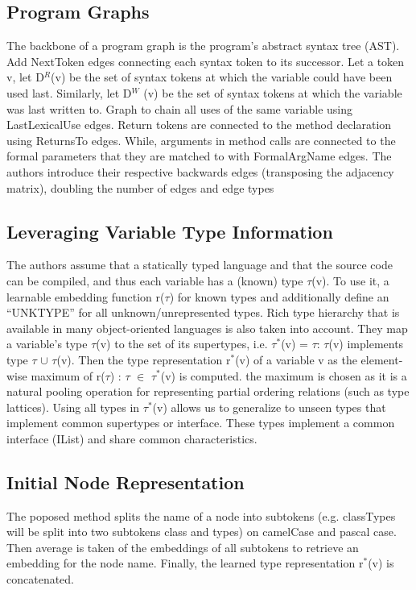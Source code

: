 \documentclass{article}
\begin{document}
\subsection{Program Graphs}
The backbone of a program graph is the program’s abstract syntax tree (AST). Add NextToken edges connecting each syntax token to its successor. Let a token v, let D$^R$(v) be the set of syntax tokens at which the variable could have been used last. Similarly, let D$^W$ (v) be the set of syntax tokens at which the variable was last written to. Graph to chain all uses of the same variable using LastLexicalUse edges. Return tokens are connected to the method declaration using ReturnsTo edges. While, arguments in method calls are connected to the formal parameters that they are matched to with FormalArgName edges. The authors introduce their respective backwards edges (transposing the adjacency matrix), doubling the number of edges and edge types

\subsection{Leveraging Variable Type Information}
The authors assume that a statically typed language and that the source code can be compiled, and thus each variable has a (known) type $\tau$(v). To use it, a learnable embedding function r($\tau$) for known types and additionally define an “UNKTYPE” for all unknown/unrepresented types. Rich type hierarchy that is available in many object-oriented languages is also taken into account. They map a variable’s type $\tau$(v) to the set of its supertypes, i.e. $\tau^\ast$(v) = {$\tau$: $\tau$(v) implements type $\tau$} $\cup$ {$\tau$(v)}. Then the type representation r$^\ast$(v) of a variable v as the element-wise maximum of {r($\tau$) : $\tau$ $\in$ $\tau^\ast$(v)} is computed. the maximum is chosen as it is a natural pooling operation for representing partial ordering relations (such as type lattices). Using all types in $\tau^\ast$(v) allows us to generalize to unseen types that implement common supertypes or interface. These types implement a common interface (IList) and share common characteristics.

\subsection{Initial Node Representation}
The poposed method splits the name of a node into subtokens (e.g. classTypes will be split into two subtokens class and types) on camelCase and pascal case. Then average is taken of the embeddings of all subtokens to retrieve an embedding for the node name. Finally, the learned type representation r$^{\ast}$(v) is concatenated.
\end{document}
